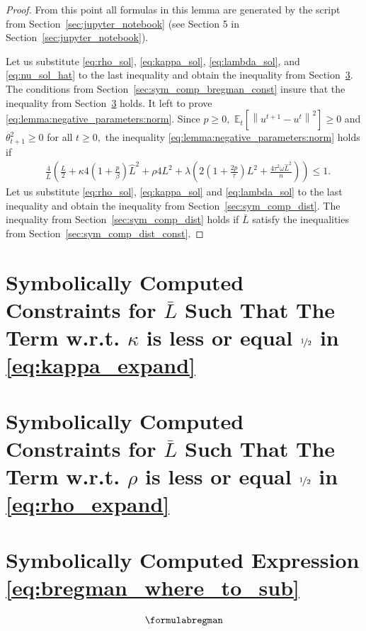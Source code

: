 \documentclass{article} %
\newcommand{\norm}[1]{\left\| #1 \right\|}
\newcommand{\ExpSub}[2]{{\mathbb{E}}_{#1}\left[#2\right]}
\theoremstyle{plain}
\theoremstyle{definition}
\theoremstyle{remark}
\begin{document}
\begin{proof}
    From this point all formulas in this lemma are generated by the script from Section~\ref{sec:jupyter_notebook} (see Section 5 in Section~\ref{sec:jupyter_notebook}).

    Let us substitute \eqref{eq:rho_sol}, \eqref{eq:kappa_sol}, \eqref{eq:lambda_sol}, and \eqref{eq:nu_sol_hat} to the last inequality and obtain the inequality from Section~\ref{sec:sym_comp_bregman}.
    The conditions from Section~\ref{sec:sym_comp_bregman_const} insure that the inequality from Section~\ref{sec:sym_comp_bregman} holds. It left to prove \eqref{eq:lemma:negative_parameters:norm}. Since $p \geq 0,$ $\ExpSub{t}{\norm{u^{t+1} - u^t}^2} \geq 0$ and $\theta_{t+1}^2 \geq 0$ for all $t \geq 0,$ the inequality \eqref{eq:lemma:negative_parameters:norm} holds if 
    \begin{align}
      &\frac{4}{\bar{L}} \left(\frac{L}{2} + \kappa 4 \left(1 + \frac{p}{\beta}\right) \widehat{L}^2 + \rho 4 L^2 + \lambda \left(2 \left(1 + \frac{2 p}{\tau}\right) L^2 + \frac{4 \tau^2 \omega \widehat{L}^2}{n}\right) \right) \leq 1. \label{eq:dist_where_to_sub}
    \end{align}
    Let us substitute \eqref{eq:rho_sol}, \eqref{eq:kappa_sol} and \eqref{eq:lambda_sol} to the last inequality and obtain the inequality from Section~\ref{sec:sym_comp_dist}. The inequality from Section~\ref{sec:sym_comp_dist} holds if $\bar{L}$ satisfy the inequalities from Section~\ref{sec:sym_comp_dist_const}.
\end{proof}

\section{Symbolically Computed Constraints for $\bar{L}$ Such That The Term w.r.t. $\kappa$ is less or equal $\nicefrac{1}{2}$ in \eqref{eq:kappa_expand}}
\label{sec:sym_comp_kapap_const}
  \formulakappaconst

\section{Symbolically Computed Constraints for $\bar{L}$ Such That The Term w.r.t. $\rho$ is less or equal $\nicefrac{1}{2}$ in \eqref{eq:rho_expand}}
\label{sec:sym_comp_rho_const}
  \formularhoconst

\section{Symbolically Computed Expression \eqref{eq:bregman_where_to_sub}}
\label{sec:sym_comp_bregman}
\begin{align*}
  \formulabregman
\end{align*}
\end{document}
